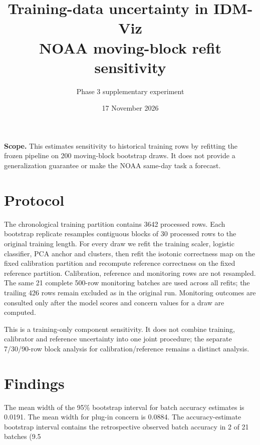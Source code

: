 \documentclass[10pt,a4paper]{article}
\title{\vspace{-2em}\color{ink}\bfseries Training-data uncertainty in IDM-Viz\\[-.2em]\large NOAA moving-block refit sensitivity}
\author{Phase 3 supplementary experiment}\date{17 November 2026}
\begin{document}
\maketitle\vspace{-1em}
\begin{tcolorbox}[colback=mist,colframe=teal,boxrule=0pt,leftrule=2mm]\textbf{Scope.} This estimates sensitivity to historical training rows by refitting the frozen pipeline on 200 moving-block bootstrap draws. It does not provide a generalization guarantee or make the NOAA same-day task a forecast.
\end{tcolorbox}
\section*{Protocol}
The chronological training partition contains 3642{} processed rows. Each bootstrap replicate resamples contiguous blocks of 30{} processed rows to the original training length. For every draw we refit the training scaler, logistic classifier, PCA anchor and clusters, then refit the isotonic correctness map on the fixed calibration partition and recompute reference correctness on the fixed reference partition. Calibration, reference and monitoring rows are not resampled. The same 21 complete 500-row monitoring batches are used across all refits; the trailing 426 rows remain excluded as in the original run. Monitoring outcomes are consulted only after the model scores and concern values for a draw are computed.

This is a training-only component sensitivity. It does not combine training, calibrator and reference uncertainty into one joint procedure; the separate 7/30/90-row block analysis for calibration/reference remains a distinct analysis.
\section*{Findings}
The mean width of the 95\% bootstrap interval for batch accuracy estimates is 0.0191. The mean width for plug-in concern is 0.0884. The accuracy-estimate bootstrap interval contains the retrospective observed batch accuracy in 2{} of 21 batches (9.5%
\end{document}
